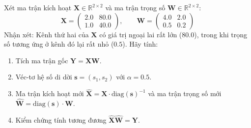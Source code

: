 \begin{example}
Xét ma trận kích hoạt $\mathbf{X} \in \mathbb{R}^{2 \times 2}$ và ma trận trọng số $\mathbf{W} \in \mathbb{R}^{2 \times 2}$:
\begin{equation*}
\mathbf{X} = \begin{pmatrix} 2.0 & 80.0 \\ 1.0 & 40.0 \end{pmatrix}, \qquad \mathbf{W} = \begin{pmatrix} 4.0 & 2.0 \\ 0.5 & 0.2 \end{pmatrix}
\end{equation*}
Nhận xét: Kênh thứ hai của $\mathbf{X}$ có giá trị ngoại lai rất lớn ($80.0$), trong khi trọng số tương ứng ở kênh đó lại rất nhỏ ($0.5$).
Hãy tính:
\begin{enumerate}
  \item Tích ma trận gốc $\mathbf{Y} = \mathbf{X} \mathbf{W}$.
  \item Véc-tơ hệ số di dời $\mathbf{s} = (s_1, s_2)$ với $\alpha = 0.5$.
  \item Ma trận kích hoạt mới $\hat{\mathbf{X}} = \mathbf{X} \cdot \text{diag}(\mathbf{s})^{-1}$ và ma trận trọng số mới $\hat{\mathbf{W}} = \text{diag}(\mathbf{s}) \cdot \mathbf{W}$.
  \item Kiểm chứng tính tương đương $\hat{\mathbf{X}} \hat{\mathbf{W}} = \mathbf{Y}$.
\end{enumerate}
\end{example}


